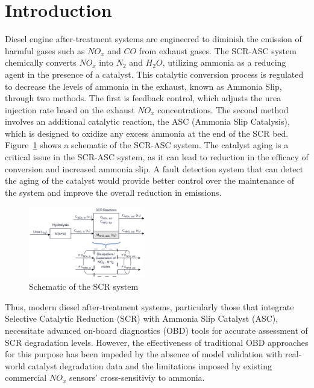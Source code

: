 \section{Introduction}

Diesel engine after-treatment systems are engineered to diminish the emission of
harmful gases such as $NO_x$ and $CO$ from exhaust gases. The SCR-ASC system
chemically converts $NO_x$ into $N_2$ and $H_2O$, utilizing ammonia as a reducing agent
in the presence of a catalyst. This catalytic conversion process is regulated to
decrease the levels of ammonia in the exhaust, known as Ammonia Slip, through
two methods. The first is feedback control, which adjusts the urea injection
rate based on the exhaust $NO_x$ concentrations. The second method involves an
additional catalytic reaction, the ASC (Ammonia Slip Catalysis), which is
designed to oxidize any excess ammonia at the end of the SCR bed.
Figure~\ref{fig:exhaust_scheme} shows a schematic of the SCR-ASC system. The
catalyst aging is a critical issue in the SCR-ASC system, as it can lead to
reduction in the efficacy of conversion and increased ammonia slip. A
fault detection system that can detect the aging of the catalyst would provide
better control over the maintenance of the system and improve the overall
reduction in emissions.

\begin{figure}[ht]
    \centering
    \includegraphics[width=0.45\textwidth]{./figs/scr_sys/scr_system.png}
    \caption{Schematic of the SCR system}
    \label{fig:exhaust_scheme}
\end{figure}


Thus, modern diesel after-treatment systems, particularly those that integrate
Selective Catalytic Reduction (SCR) with Ammonia Slip Catalyst (ASC),
necessitate advanced on-board diagnostics (OBD) tools for accurate assessment of
SCR degradation levels. However, the effectiveness of traditional OBD approaches
for this purpose has been impeded by the absence of model validation with
real-world catalyst degradation data and the limitations imposed by existing
commercial $NO_x$ sensors' cross-sensitiviy to ammonia.

